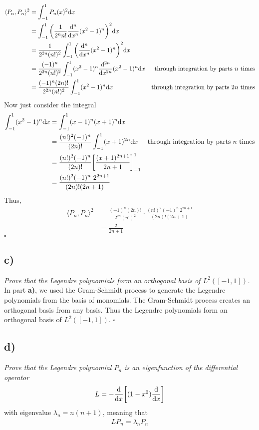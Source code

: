 \documentclass[12pt]{article}
\theoremstyle{plain}
\begin{document}
\begin{align*}
    \langle P_n, P_n\rangle^2 &= \int_{-1}^1 P_n(x)^2\dd x \\
    &= \int_{-1}^1\qty(\frac{1}{2^n n!}\frac{\dd^n}{\dd x^n}(x^2 - 1)^n)^2 \dd x \\
    &= \frac{1}{2^{2n}(n!)^2}\int_{-1}^1\qty(\frac{\dd^n}{\dd x^n} (x^2 - 1)^n)^2 \dd x \\
    &= \frac{(-1)^n}{2^{2n}(n!)^2}\int_{-1}^1 (x^2 - 1)^n \frac{\dd^{2n}}{\dd x^{2n}}(x^2 - 1)^n \dd x & \text{through integration by parts $n$ times} \\
    &= \frac{(-1)^n(2n)!}{2^{2n}(n!)^2}\int_{-1}^1(x^2 - 1)^n \dd x & \text{through integration by parts $2n$ times}
\end{align*}
Now just consider the integral
\begin{align*}
    \int_{-1}^1 (x^2 - 1)^n \dd x &= \int_{-1}^1 (x-1)^n (x+1)^n \dd x \\
    &= \frac{(n!)^2(-1)^n}{(2n)!}\int_{-1}^1 (x + 1)^{2n} \dd x & \text{through integration by parts $n$ times} \\
    &= \frac{(n!)^2(-1)^n}{(2n)!}\qty[\frac{(x+1)^{2n+1}}{2n+1}]_{-1}^1 \\
    &= \frac{(n!)^2(-1)^n\ 2^{2n+1}}{(2n)! (2n+1)}
\end{align*}
Thus, 
\begin{align*}
    \langle P_n, P_n\rangle^2 &= \frac{(-1)^n(2n)!}{2^{2n}(n!)^2} \cdot \frac{(n!)^2(-1)^n\ 2^{2n+1}}{(2n)! (2n+1)} \\
    &= \frac{2}{2n+1}
\end{align*}
\hfill $\square$

\subsection*{ c)}
\emph{Prove that the Legendre polynomials form an orthogonal basis of $L^2([-1,1])$.} \\

In part \textbf{a)}, we used the Gram-Schmidt process to generate the Legendre polynomials from the basis of monomials.  The Gram-Schmidt process creates an orthogonal basis from any basis.  Thus the Legendre polynomials form an orthogonal basis of $L^2([-1,1])$. \hfill $\square$

\subsection*{ d)}
\emph{Prove that the Legendre polynomial $P_n$ is an eigenfunction of the differential operator}
\begin{align*}
    L = -\frac{\dd}{\dd x}\qty[(1 - x^2)\frac{\dd}{\dd x}]
\end{align*}
with eigenvalue $\lambda_n = n(n+1)$, meaning that
\begin{align*}
    LP_n = \lambda_nP_n
\end{align*}
\end{document}
